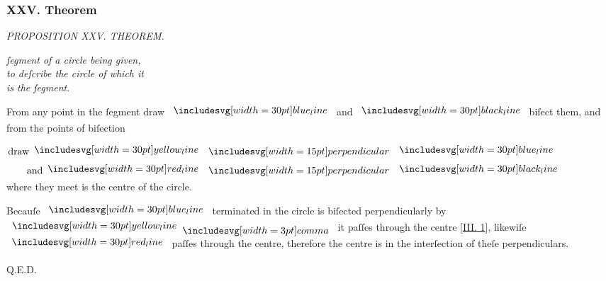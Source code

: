 \documentclass[11pt,preview]{standalone}
\begin{document}
\subsubsection{XXV. Theorem}

\begin{minipage}[t]{0.54\textwidth}
    \begin{center}
        \textit{PROPOSITION XXV. THEOREM.}\label{book3pr25} \\
    \end{center}

    \hfill

    \begin{center}
        \raggedright \lettrine[lines=3, loversize=1, nindent=0pt]{}{} \textit{ſegment of a circle being given,\\ to deſcribe the circle of which it\\ is the ſegment}.
    \end{center}
\end{minipage}%
\hfill
\begin{minipage}[t]{0.43\textwidth}
    \vspace{20pt}
    
\end{minipage}%

\hfill

\hfill

\raggedright From any point in the ſegment draw $\blueline$ and $\blackline$ biſect them, and from the points of biſection\\

\hfill

\begin{center}
    $\begin{aligned}
            \text{draw} \yellowline & \bperp \blueline  \\
            \text{and} \redline     & \bperp \blackline
        \end{aligned}$\\
    where they meet is the centre of the circle.
\end{center}

\hfill

\begin{center}
    Becauſe $\blueline$ terminated in the circle is biſected perpendicularly by $\yellowline \bcomma$ it paſſes through the centre [\hyperref[book3pr1]{\textsc{III.} 1}], likewiſe $\redline$ paſſes through the centre, therefore the centre is in the interſection of theſe perpendiculars.
\end{center}

\hfill

\hfill Q.E.D.
\end{document}

